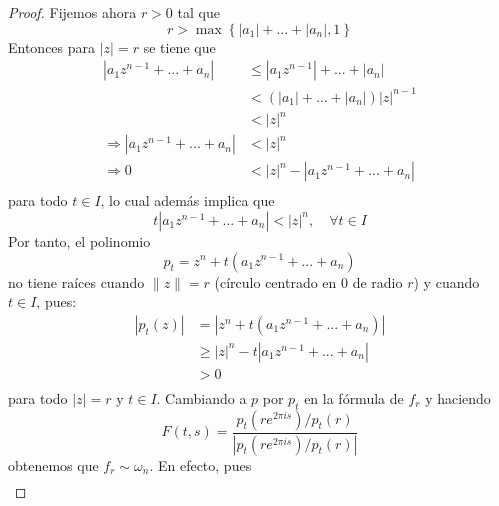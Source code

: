 \documentclass[12pt]{report}
\theoremstyle{largebreak}
\newcommand\abs[1]{\ensuremath{\left|#1\right|}}
\begin{document}
\begin{proof}
        Fijemos ahora $r>0$ tal que
        \begin{equation*}
            r>\max\left\{\abs{a_1}+...+\abs{a_n},1\right\}
        \end{equation*}
        Entonces para $\abs{z}=r$ se tiene que
        \begin{equation*}
            \begin{split}
                \abs{a_1z^{ n-1}+...+a_n}&\leq\abs{a_1z^{ n-1}}+...+\abs{a_n}\\
                &<(\abs{a_1}+...+\abs{a_n})\abs{z}^{n-1}\\
                &<\abs{z}^n\\
                \Rightarrow \abs{a_1z^{ n-1}+...+a_n}&<\abs{z}^n\\
                \Rightarrow 0 &< \abs{z}^n-\abs{a_1z^{ n-1}+...+a_n}\\
            \end{split}
        \end{equation*}
        para todo $t\in I$, lo cual además implica que
        \begin{equation*}
            t\abs{a_1z^{ n-1}+...+a_n}<\abs{z}^n,\quad\forall t\in I
        \end{equation*}
        Por tanto, el polinomio
        \begin{equation*}
            p_t=z^n+t\left(a_1z^{ n-1}+...+a_n \right)
        \end{equation*}
        no tiene raíces cuando $\|z\|=r$ (círculo centrado en 0 de radio $r$) y cuando $t\in I$, pues:
        \begin{equation*}
            \begin{split}
                \abs{p_t(z)}&=\abs{z^n+t\left(a_1z^{ n-1}+...+a_n \right)}\\
                &\geq\abs{z}^n-t\abs{a_1z^{ n-1}+...+a_n}\\
                &>0\\
            \end{split}
        \end{equation*}
        para todo $\abs{z}=r$ y $t\in I$. Cambiando a $p$ por $p_t$ en la fórmula de $f_r$ y haciendo
        \begin{equation*}
            F(t,s)=\frac{p_t(re^{ 2\pi is})/p_t(r)}{\abs{p_t(re^{ 2\pi is})/p_t(r)}}
        \end{equation*}
        obtenemos que $f_r\sim\omega_n$. En efecto, pues
        \begin{equation*}
            \begin{split}

\end{split}
\end{equation*}
\end{proof}
\end{document}

